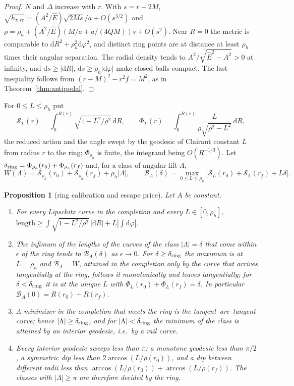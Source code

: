\documentclass[aip,jmp,amsmath,amssymb,reprint]{revtex4-2}
\newcommand{\Ehat}{\hat E}
\newcommand{\dd}{\mathrm{d}}
\theoremstyle{plain}
\newtheorem{proposition}{Proposition}[section]
\theoremstyle{definition}
\begin{document}
\begin{proof}
$N$ and $\Delta$ increase with $r$. With $s=r-2M$, $\sqrt{h_{\tau,rr}}=(A^2/\Ehat)\sqrt{2Ms}/a+O(s^{3/2})$ and
$\rho=\rho_h+(A^2/\Ehat)(M/a+a/(4QM))s+O(s^2)$. Near $R=0$ the metric is comparable to
$\dd R^2+\rho_h^2\dd\varphi^2$, and distinct ring points are at distance at least $\rho_h$ times their
angular separation. The radial density tends to $A^2/\sqrt{\Ehat^2-A^2}>0$ at infinity, and
$\dd s\ge|\dd R|$, $\dd s\ge\rho_h|\dd\varphi|$ make closed balls compact. The last inequality follows from $(r-M)^2-r^2f=M^2$, as in
Theorem~\ref{thm:antipodal}.
\end{proof}

For $0\le L\le\rho_h$ put
\[
  \mathcal S_L(r)=\int_0^{R(r)}\sqrt{1-L^2/\rho^2}\,\dd R,\qquad
  \Phi_L(r)=\int_0^{R(r)}\frac{L}{\rho\sqrt{\rho^2-L^2}}\,\dd R,
\]
the reduced action and the angle swept by the geodesic of Clairaut constant $L$ from radius $r$ to
the ring; $\Phi_{\rho_h}$ is finite, the integrand being $O(R^{-1/3})$. Let $\delta_{\rm ring}=\Phi_{\rho_h}(r_0)+\Phi_{\rho_h}(r_f)$ and,
for a class of angular lift $\Lambda$,
\begin{equation}
  W(\Lambda)=\mathcal S_{\rho_h}(r_0)+\mathcal S_{\rho_h}(r_f)+\rho_h|\Lambda|,\qquad
  \mathcal B_A(\delta)=\max_{0\le L\le\rho_h}\bigl[\mathcal S_L(r_0)+\mathcal S_L(r_f)+L\delta\bigr].
  \label{eq:tau-eq-price}
\end{equation}

\begin{proposition}[ring calibration and escape price]\label{prop:tau-eq-price}
Let $A$ be constant.
\begin{enumerate}
\item For every Lipschitz curve in the completion and every $L\in[0,\rho_h]$,
  $\mathrm{length}\ge\int\sqrt{1-L^2/\rho^2}\,|\dd R|+L|\int\dd\varphi|$.
\item The infimum of the lengths of the curves of the class $|\Lambda|=\delta$ that come within
  $\epsilon$ of the ring tends to $\mathcal B_A(\delta)$ as $\epsilon\to0$. For $\delta\ge\delta_{\rm ring}$ the
  maximum is at $L=\rho_h$ and $\mathcal B_A=W$, attained in the completion only by the curve that
  arrives tangentially at the ring, follows it monotonically and leaves tangentially; for
  $\delta<\delta_{\rm ring}$ it is at the unique $L$ with $\Phi_L(r_0)+\Phi_L(r_f)=\delta$. In particular
  $\mathcal B_A(0)=R(r_0)+R(r_f)$.
\item A minimizer in the completion that meets the ring is the tangent--arc--tangent curve;
  hence $|\Lambda|\ge\delta_{\rm ring}$, and for $|\Lambda|<\delta_{\rm ring}$ the minimum of the class is attained by
  an interior geodesic, i.e.\ by a rail curve.
\item Every interior geodesic sweeps less than $\pi$: a monotone geodesic less than $\pi/2$, a
  symmetric dip less than $2\arccos(L/\rho(r_0))$, and a dip between different radii less than
  $\arccos(L/\rho(r_0))+\arccos(L/\rho(r_f))$. The classes with
  $|\Lambda|\ge\pi$ are therefore decided by the ring.
\end{enumerate}
\end{proposition}
\end{document}

